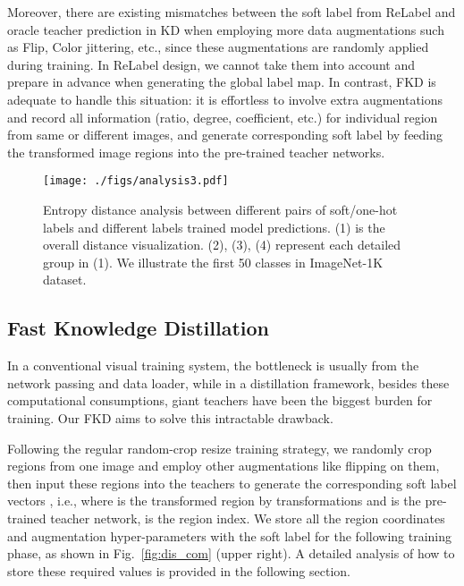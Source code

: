 \documentclass[10pt,twocolumn,letterpaper]{article}
\begin{document}
Moreover, there are existing mismatches between the soft label from ReLabel and oracle teacher prediction in KD when employing more data augmentations such as Flip, Color jittering, etc., since these augmentations are randomly applied during training. In ReLabel design, we cannot take them into account and prepare in advance when generating the global label map. In contrast, FKD is adequate to handle this situation: it is effortless to involve extra augmentations and record all information (ratio, degree, coefficient, etc.) for individual region from same or different images, and generate corresponding soft label by feeding the transformed image regions into the pre-trained teacher networks.

\begin{figure*}[h]
  \centering
  \texttt{[image: ./figs/analysis3.pdf]}
  \vspace{-0.15in}
  \caption{Entropy distance analysis between different pairs of soft/one-hot labels and different labels trained model predictions. (1) is the overall distance visualization. (2), (3), (4) represent each detailed group in (1). We illustrate the first 50 classes in ImageNet-1K dataset.} 
  \label{fig:CE_analysis}
  \vspace{-0.13in}
\end{figure*}

\subsection{Fast Knowledge Distillation}
\vspace{-0.05in}

In a conventional visual training system, the bottleneck is usually from the network passing and data loader, while in a distillation framework, besides these computational consumptions, giant teachers have been the biggest burden for training. Our FKD aims to solve this intractable drawback.

 Following the regular random-crop resize training strategy, we randomly crop  regions from one image and employ other augmentations like flipping on them, then input these regions into the teachers to generate the corresponding soft label vectors , i.e.,  where  is the transformed region by transformations  and  is the pre-trained teacher network,  is the region index. We store all the region coordinates and augmentation hyper-parameters  with the soft label  for the following training phase, as shown in Fig.~\ref{fig:dis_com} (upper right). A detailed analysis of how to store these required values is provided in the following section.
\end{document}
